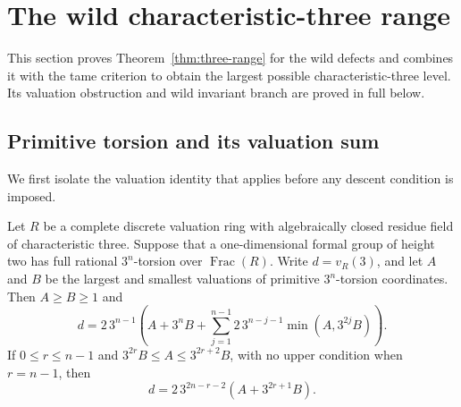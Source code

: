 \section{The wild characteristic-three range}\label{sec:three}
This section proves Theorem~\ref{thm:three-range} for the wild defects and combines it with the tame criterion to obtain the largest possible characteristic-three level. Its valuation obstruction and wild invariant branch are proved in full below.

\subsection{Primitive torsion and its valuation sum}
We first isolate the valuation identity that applies before any descent condition is imposed.

\begin{lemma}\label{lem:valuation-sum}
Let $R$ be a complete discrete valuation ring with algebraically closed residue field of characteristic three. Suppose that a one-dimensional formal group of height two has full rational $3^n$-torsion over $\operatorname{Frac}(R)$. Write $d=v_R(3)$, and let $A$ and $B$ be the largest and smallest valuations of primitive $3^n$-torsion coordinates. Then $A\ge B\ge1$ and
\begin{equation}\label{eq:primitive-sum}
 d=2\,3^{n-1}\left(A+3^nB+
       \sum_{j=1}^{n-1}2\,3^{n-j-1}\min(A,3^{2j}B)\right).
\end{equation}
If $0\le r\le n-1$ and $3^{2r}B\le A\le3^{2r+2}B$, with no upper condition when $r=n-1$, then
\begin{equation}\label{eq:regional-sum}
 d=2\,3^{2n-r-2}(A+3^{2r+1}B).
\end{equation}
\end{lemma}

